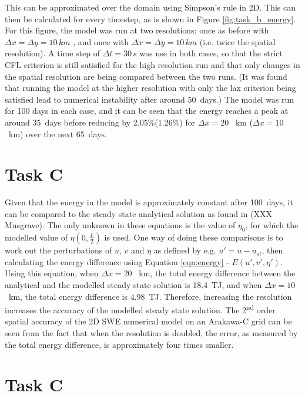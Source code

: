 \documentclass{article}
\newcommand{\ts}{\textsuperscript}
\begin{document}
This can be approximated over the domain using Simpson's rule in 2D. This can then be calculated for
every timestep, as is shown in Figure \ref{fig:task_b_energy}. For this figure, the model was run at
two resolutions: once as before with $\Delta x = \Delta y = 10\, km$ , and once with $\Delta x =
\Delta y = 10\, km$ (i.e. twice the spatial resolution). A time step of $\Delta t = 30\, s$ was use
in both cases, so that the strict CFL criterion is still satisfied for the high resolution run and
that only changes in the spatial resolution are being compared between the two runs. (It was found
that running the model at the higher resolution with only the lax criterion being satisfied lead to
numerical instability after around \SI{50}{days}.) The model was run for 100 days in each case, and
it can be seen that the energy reaches a peak at around \SI{35}{days} before reducing by
2.05\%(1.26\%) for $\Delta x = 20$ \SI{}{km} ($\Delta x = 10$ \SI{}{km}) over the next
\SI{65}{days}.

\section*{Task C}

Given that the energy in the model is approximately constant after \SI{100}{days}, it can be
compared to the steady state analytical solution as found in (XXX Musgrave). The only unknown in
these equations is the value of $\eta_0$, for which the modelled value of $\eta(0, \frac{L}{2})$ is
used. One way of doing these comparisons is to work out the perturbations of $u$, $v$ and $\eta$ as
defined by e.g. $u' = u - u_{st}$, then calculating the energy difference using Equation
\ref{eqn:energy} - $E(u', v', \eta')$. Using this equation, when $\Delta x = 20$ \SI{}{km}, the
total energy difference between the analytical and the modelled steady state solution is
\SI{18.4}{TJ}, and when $\Delta x = 10$ \SI{}{km}, the total energy difference is \SI{4.98}{TJ}.
Therefore, increasing the resolution increases the accuracy of the modelled steady state solution.
The 2\ts{nd} order spatial accuracy of the 2D SWE numerical model on an Arakawa-C grid can be seen
from the fact that when the resolution is doubled, the error, as measured by the total energy
difference, is approximately four times smaller. 

\section*{Task C}
\end{document}
